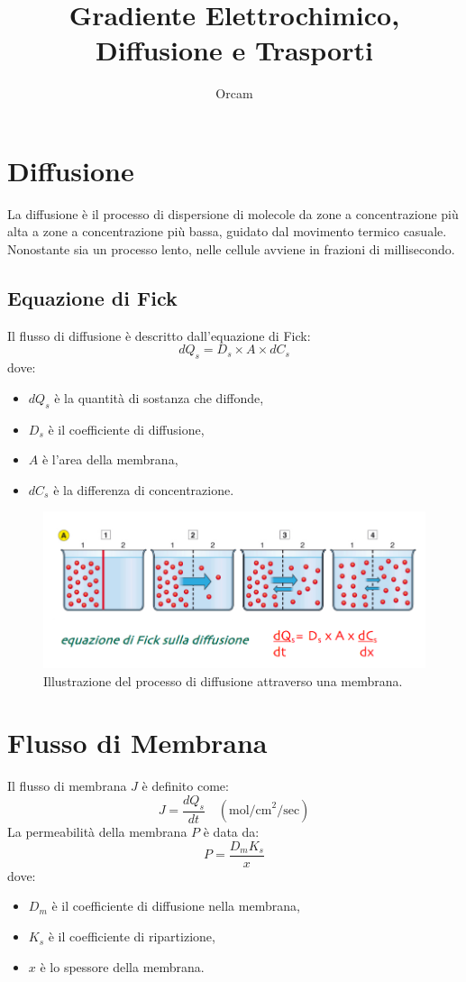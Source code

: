 \documentclass{article}
\title{Gradiente Elettrochimico, Diffusione e Trasporti}
\author{Orcam}
\date{}
\begin{document}
\maketitle

\section{Diffusione}
La diffusione è il processo di dispersione di molecole da zone a concentrazione più alta a zone a concentrazione più bassa, guidato dal movimento termico casuale. Nonostante sia un processo lento, nelle cellule avviene in frazioni di millisecondo.

\subsection{Equazione di Fick}
Il flusso di diffusione è descritto dall'equazione di Fick:
\[
dQ_s = D_s \times A \times dC_s
\]
dove:
\begin{itemize}
    \item \(dQ_s\) è la quantità di sostanza che diffonde,
    \item \(D_s\) è il coefficiente di diffusione,
    \item \(A\) è l'area della membrana,
    \item \(dC_s\) è la differenza di concentrazione.
\end{itemize}

\begin{figure}[h]
    \centering
    \includegraphics[width=1\textwidth]{Neuroscienze 2024-2025/Modulo I/Immagini Modulo I/Screenshot 2025-06-21 at 16-22-28 4. Gradiente elettrochimico_Diffusione facilitata_trasporti.pdf.png}
    \caption{Illustrazione del processo di diffusione attraverso una membrana.}
    \label{fig:diffusione}
\end{figure}

\section{Flusso di Membrana}
Il flusso di membrana \(J\) è definito come:
\[
J = \frac{dQ_s}{dt} \quad (\text{mol/cm}^2/\text{sec})
\]
La permeabilità della membrana \(P\) è data da:
\[
P = \frac{D_m K_s}{x}
\]
dove:
\begin{itemize}
    \item \(D_m\) è il coefficiente di diffusione nella membrana,
    \item \(K_s\) è il coefficiente di ripartizione,
    \item \(x\) è lo spessore della membrana.
\end{itemize}
\end{document}
